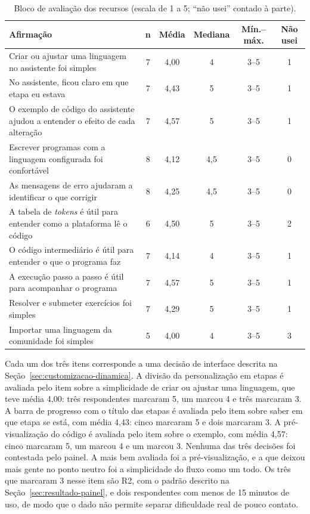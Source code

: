 \begin{table}[htbp]
\centering
\caption{Bloco de avaliação dos recursos (escala de 1 a 5; ``não usei'' contado à parte).}
\label{tab:resultado-recursos}
\footnotesize
\renewcommand{\arraystretch}{1.2}
\begin{tabular}{|p{7.9cm}|c|c|c|c|c|}
\hline
\textbf{Afirmação} & \textbf{n} & \textbf{Média} & \textbf{Mediana} & \textbf{Mín.--máx.} & \textbf{Não usei} \\\hline
Criar ou ajustar uma linguagem no assistente foi simples & 7 & 4,00 & 4 & 3--5 & 1 \\\hline
No assistente, ficou claro em que etapa eu estava & 7 & 4,43 & 5 & 3--5 & 1 \\\hline
O exemplo de código do assistente ajudou a entender o efeito de cada alteração & 7 & 4,57 & 5 & 3--5 & 1 \\\hline
Escrever programas com a linguagem configurada foi confortável & 8 & 4,12 & 4,5 & 3--5 & 0 \\\hline
As mensagens de erro ajudaram a identificar o que corrigir & 8 & 4,25 & 4,5 & 3--5 & 0 \\\hline
A tabela de \textit{tokens} é útil para entender como a plataforma lê o código & 6 & 4,50 & 5 & 3--5 & 2 \\\hline
O código intermediário é útil para entender o que o programa faz & 7 & 4,14 & 4 & 3--5 & 1 \\\hline
A execução passo a passo é útil para acompanhar o programa & 7 & 4,57 & 5 & 3--5 & 1 \\\hline
Resolver e submeter exercícios foi simples & 7 & 4,29 & 5 & 3--5 & 1 \\\hline
Importar uma linguagem da comunidade foi simples & 5 & 4,00 & 4 & 3--5 & 3 \\\hline
\end{tabular}
\end{table}

Cada um dos três itens corresponde a uma decisão de interface descrita na Seção~\ref{sec:customizacao-dinamica}. A divisão da personalização em etapas é avaliada pelo item sobre a simplicidade de criar ou ajustar uma linguagem, que teve média 4,00: três respondentes marcaram 5, um marcou 4 e três marcaram 3. A barra de progresso com o título das etapas é avaliada pelo item sobre saber em que etapa se está, com média 4,43: cinco marcaram 5 e dois marcaram 3. A pré-visualização do código é avaliada pelo item sobre o exemplo, com média 4,57: cinco marcaram 5, um marcou 4 e um marcou 3. Nenhuma das três decisões foi contestada pelo painel. A mais bem avaliada foi a pré-visualização, e a que deixou mais gente no ponto neutro foi a simplicidade do fluxo como um todo. Os três que marcaram 3 nesse item são R2, com o padrão descrito na Seção~\ref{sec:resultado-painel}, e dois respondentes com menos de 15 minutos de uso, de modo que o dado não permite separar dificuldade real de pouco contato.

